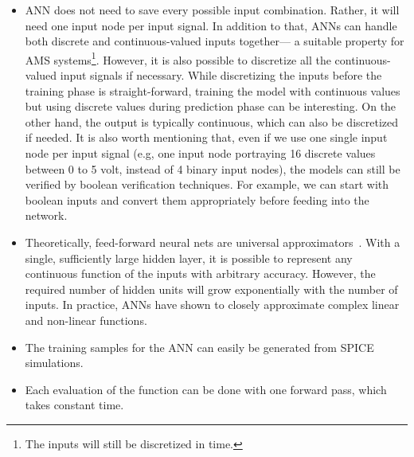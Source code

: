\documentclass[a4paper]{article}
\begin{document}

\begin{itemize}
	\item ANN does not need to save every possible input combination. Rather, it will need one input node per input signal. In addition to that, ANNs can handle both discrete and continuous-valued inputs together--- a suitable property for AMS systems\footnote{The inputs will still be discretized in time.}. However, it is also possible to discretize all the continuous-valued input signals if necessary. While discretizing the inputs before the training phase is straight-forward, training the model with continuous values but using discrete values during prediction phase can be interesting. On the other hand, the output is typically continuous, which can also be discretized if needed. 
	It is also worth mentioning that, even if we use one single input node per input signal (e.g, one input node portraying 16 discrete values between 0 to 5 volt, instead of 4 binary input nodes), the models can still be verified by boolean verification techniques. For example, we can start with boolean inputs and convert them appropriately before feeding into the network.  
	 
	\item Theoretically, feed-forward neural nets are universal approximators~\cite{ANN_UNI_APPX}. With a single, sufficiently large hidden layer, it is possible to represent any continuous function of the inputs with arbitrary accuracy. However, the required number of hidden units will grow exponentially with the number of inputs. In practice, ANNs have shown to closely approximate complex linear and non-linear functions. 
	 
	\item The training samples for the ANN can easily be generated from SPICE simulations.
	 
	\item Each evaluation of the function can be done with one forward pass, which takes constant time. %
	
\end{itemize}
\end{document}
